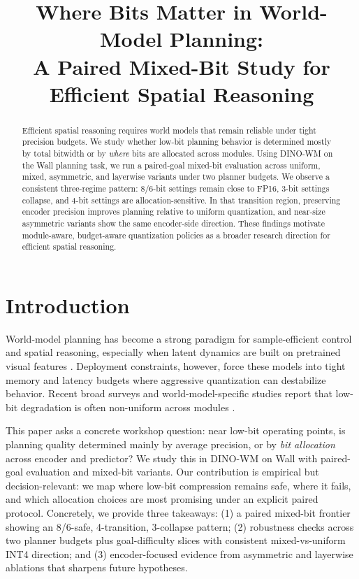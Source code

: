 \documentclass{article}
\title{Where Bits Matter in World-Model Planning:\\A Paired Mixed-Bit Study for Efficient Spatial Reasoning}
\author{}
\begin{document}
\maketitle
{}

\begin{abstract}
Efficient spatial reasoning requires world models that remain reliable under tight precision budgets.
We study whether low-bit planning behavior is determined mostly by total bitwidth or by \emph{where} bits are allocated across modules.
Using DINO-WM on the Wall planning task, we run a paired-goal mixed-bit evaluation across uniform, mixed, asymmetric, and layerwise variants under two planner budgets.
We observe a consistent three-regime pattern: 8/6-bit settings remain close to FP16, 3-bit settings collapse, and 4-bit settings are allocation-sensitive.
In that transition region, preserving encoder precision improves planning relative to uniform quantization, and near-size asymmetric variants show the same encoder-side direction.
These findings motivate module-aware, budget-aware quantization policies as a broader research direction for efficient spatial reasoning.
\end{abstract}

\section{Introduction}
World-model planning has become a strong paradigm for sample-efficient control and spatial reasoning, especially when latent dynamics are built on pretrained visual features \citep{hafner2023dreamerv3,oquab2023dinov2,zhou2024dinowm}.
Deployment constraints, however, force these models into tight memory and latency budgets where aggressive quantization can destabilize behavior.
Recent broad surveys and world-model-specific studies report that low-bit degradation is often non-uniform across modules \citep{liu2025lowbitmodelquantizationdeep,fu2026quantwm}.

This paper asks a concrete workshop question: near low-bit operating points, is planning quality determined mainly by average precision, or by \emph{bit allocation} across encoder and predictor?
We study this in DINO-WM on Wall with paired-goal evaluation and mixed-bit variants.
Our contribution is empirical but decision-relevant: we map where low-bit compression remains safe, where it fails, and which allocation choices are most promising under an explicit paired protocol.
Concretely, we provide three takeaways: (1) a paired mixed-bit frontier showing an 8/6-safe, 4-transition, 3-collapse pattern; (2) robustness checks across two planner budgets plus goal-difficulty slices with consistent mixed-vs-uniform INT4 direction; and (3) encoder-focused evidence from asymmetric and layerwise ablations that sharpens future hypotheses.
\end{document}
